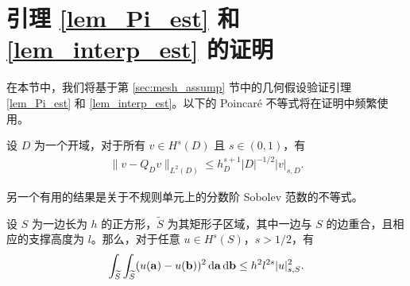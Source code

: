 \section{引理 \ref{lem_Pi_est} 和 \ref{lem_interp_est} 的证明}
\label{sec:lemmaproof}

在本节中，我们将基于第 \ref{sec:mesh_assump} 节中的几何假设验证引理
\ref{lem_Pi_est} 和 \ref{lem_interp_est}。以下的 Poincar\'e
\cite[引理 7.1]{2017ErnGuermond} 不等式将在证明中频繁使用。
\begin{lemma}
\label{lem_proj_approxi}
设 \( D \) 为一个开域，对于所有 \( v \in H^s(D) \) 且 \( s \in (0,1) \)，有
\begin{align}
\label{lem_proj_approxi_eq01}
\| v - Q_D v \|_{L^2(D)} \le h^{s+1}_D |D|^{-1/2} |v|_{s,D}.
\end{align}
\end{lemma}
另一个有用的结果是关于不规则单元上的分数阶 Sobolev 范数的不等式。
\begin{lemma}
\label{lem_geometry_patch}
设 \( S \) 为一边长为 \( h \) 的正方形，\( \widetilde{S} \) 为其矩形子区域，其中一边与 \( S \) 的边重合，且相应的支撑高度为 \( l \)。那么，对于任意 \( u \in H^s(S) \)，\( s > 1/2 \)，有
\begin{equation}
\label{lem_geometry_patch_eq0}
\int_{\widetilde{S}} \int_{\widetilde{S}} (u(\mathbf{a}) - u(\mathbf{b}) )^2 \, \mathrm{ d} \mathbf{a} \, \mathrm{ d} \mathbf{b} \le h^2 l^{2s}  |u |^2_{s,S}.
\end{equation}
\end{lemma}
